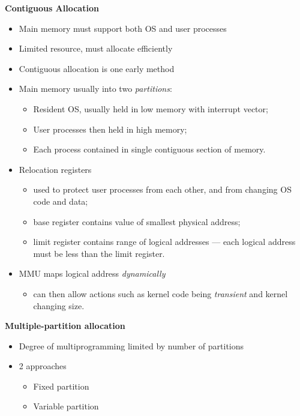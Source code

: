 \documentclass[11pt,a4paper]{article}
\begin{document}
\textbf{Contiguous Allocation}
\begin{itemize}
    \item Main memory must support both OS and user processes
    \item Limited resource, must allocate efficiently
    \item Contiguous allocation is one early method
    \item Main memory usually into two \emph{partitions}:
        \begin{itemize}
            \item Resident OS, usually held in low memory with interrupt vector;
            \item User processes then held in high memory;
            \item Each process contained in single contiguous section of memory.
        \end{itemize}
    \item Relocation registers
        \begin{itemize}
            \item used to protect user processes from each other, and from changing
                OS code and data;
            \item base register contains value of smallest physical address;
            \item limit register contains range of logical addresses --- each logical
                address must be less than the limit register.
        \end{itemize}
    \item MMU maps logical address \emph{dynamically}
        \begin{itemize}
            \item can then allow actions such as kernel code being \emph{transient}
                and kernel changing size.
        \end{itemize}
\end{itemize}

\textbf{Multiple-partition allocation}
\begin{itemize}
    \item Degree of multiprogramming limited by number of partitions
    \item 2 approaches
        \begin{itemize}
            \item Fixed partition
            \item Variable partition
        \end{itemize}
\end{itemize}
\end{document}
